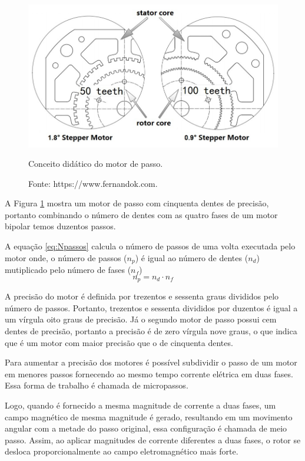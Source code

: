\begin{figure}[!htb]
\centering
\includegraphics[scale = 0.4]{figuras/didaticopasso}
\caption{Conceito didático do motor de passo.}
\caption*{Fonte: https://www.fernandok.com.}
\label{fig:didaticopasso}
\end{figure}
    
A Figura \ref{fig:didaticopasso} mostra um motor de passo com cinquenta dentes de precisão, portanto combinando 
o número de dentes com as quatro fases de um motor bipolar temos duzentos passos. 

A equação \ref{eq:Npassos} calcula o número de passos de uma volta executada pelo motor onde,
o número de passos ($n_{p}$) é igual ao número de dentes ($n_{d}$) mutiplicado pelo número de fases ($n_{f}$)
\begin{equation}\label{eq:Npassos}
    n_{p} = n_{d} \cdot n_{f}
\end{equation}

A precisão do motor é definida por trezentos e sessenta graus divididos pelo número de passos. Portanto, 
trezentos e sessenta divididos por duzentos é igual a um vírgula oito graus de precisão. Já o segundo motor 
de passo possui cem dentes de precisão, portanto a precisão é de zero vírgula nove graus, o que indica que 
é um motor com maior precisão que o de cinquenta dentes.

Para aumentar a precisão dos motores é possível subdividir o passo de um motor em menores passos fornecendo 
ao mesmo tempo corrente elétrica em duas fases. Essa forma de trabalho é chamada de micropassos.

Logo, quando é fornecido a mesma magnitude de corrente a duas fases, um campo magnético de mesma magnitude 
é gerado, resultando em um movimento angular com a metade do passo original, essa configuração é chamada de 
meio passo. Assim, ao aplicar magnitudes de corrente diferentes a duas fases, o rotor se desloca 
proporcionalmente ao campo eletromagnético mais forte.


